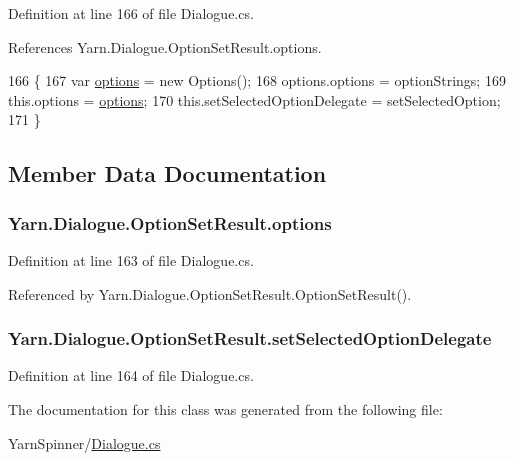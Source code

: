 Definition at line 166 of file Dialogue.\-cs.



References Yarn.\-Dialogue.\-Option\-Set\-Result.\-options.


\begin{DoxyCode}
166                                                                                                   \{
167                 var \hyperlink{a00139_abda9c3047ff9d3c3ec5540566a239315}{options} = \textcolor{keyword}{new} Options();
168                 options.options = optionStrings;
169                 this.options = \hyperlink{a00139_abda9c3047ff9d3c3ec5540566a239315}{options};
170                 this.setSelectedOptionDelegate = setSelectedOption;
171             \}
\end{DoxyCode}


\subsection{Member Data Documentation}
\hypertarget{a00139_abda9c3047ff9d3c3ec5540566a239315}{
\subsubsection[{options}]{ Yarn.\-Dialogue.\-Option\-Set\-Result.\-options}}\label{a00139_abda9c3047ff9d3c3ec5540566a239315}


Definition at line 163 of file Dialogue.\-cs.



Referenced by Yarn.\-Dialogue.\-Option\-Set\-Result.\-Option\-Set\-Result().

\hypertarget{a00139_a6f2683598cf0f62b76bb864640cc79dd}{
\subsubsection[{set\-Selected\-Option\-Delegate}]{ Yarn.\-Dialogue.\-Option\-Set\-Result.\-set\-Selected\-Option\-Delegate}}\label{a00139_a6f2683598cf0f62b76bb864640cc79dd}


Definition at line 164 of file Dialogue.\-cs.



The documentation for this class was generated from the following file\-:\begin{DoxyCompactItemize}
\item 
Yarn\-Spinner/\hyperlink{a00296}{Dialogue.\-cs}\end{DoxyCompactItemize}
